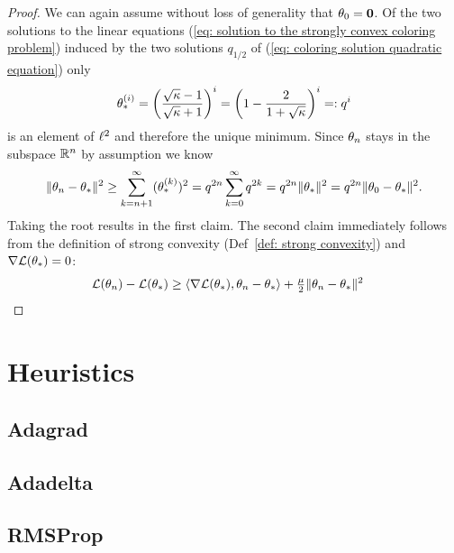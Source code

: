 \begin{proof}
	We can again assume without loss of generality that \(\theta_0=\mathbf{0}\).
	Of the two solutions to the linear equations (\ref{eq: solution to the
	strongly convex coloring problem}) induced by the two solutions \(q_{1/2}\)
	of (\ref{eq: coloring solution quadratic equation}) only
	\begin{align*}
		\theta_*^{(i)} = \left(\frac{\sqrt{\kappa}-1}{\sqrt{\kappa}+1}\right)^i
		= \left(1 - \frac{2}{1+\sqrt{\kappa}}\right)^i =: q^i
	\end{align*}
	is an element of \(\ell^{2}\) and therefore the unique minimum. Since 
	\(\theta_n\) stays in the subspace \(\mathbb{R}^n\) by assumption we know
	\begin{align*}
		\|\theta_n -\theta_*\|^2
		\ge \sum_{k=n+1}^\infty (\theta_*^{(k)})^2
		= q^{2n} \sum_{k=0}^\infty q^{2k}
		= q^{2n} \| \theta_*\|^2
		= q^{2n} \|\theta_0 - \theta_*\|^2.
	\end{align*}
	Taking the root results in the first claim. The second claim immediately
	follows from the definition of strong convexity (Def~\ref{def: strong convexity})
	and \(\nabla\mathcal{L}(\theta_*) = 0\):
	\begin{align*}
		\mathcal{L}(\theta_n) - \mathcal{L}(\theta_*)
		&\ge \langle \nabla\mathcal{L}(\theta_*), \theta_n -\theta_*\rangle
		+\tfrac{\mu}{2} \|\theta_n -\theta_*\|^2
		\qedhere
	\end{align*}
\end{proof}

\section{Heuristics}

\subsection{Adagrad}

\subsection{Adadelta}

\subsection{RMSProp}


\endinput